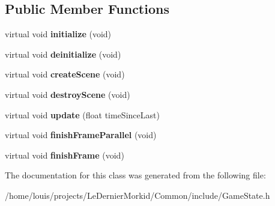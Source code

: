 \subsection*{Public Member Functions}
\begin{DoxyCompactItemize}
\item 
\mbox{\label{class_common_1_1_game_state_a4e7fa2fbc9080111213ce379eb33d082}} 
virtual void {\bfseries initialize} (void)
\item 
\mbox{\label{class_common_1_1_game_state_a7cda78fa6c4a405ead90c6e0bc895c85}} 
virtual void {\bfseries deinitialize} (void)
\item 
\mbox{\label{class_common_1_1_game_state_a30b77d03dd849ebb2d6698686e9e7619}} 
virtual void {\bfseries create\+Scene} (void)
\item 
\mbox{\label{class_common_1_1_game_state_a03176055b9cb064b2cea5b64cbf6647a}} 
virtual void {\bfseries destroy\+Scene} (void)
\item 
\mbox{\label{class_common_1_1_game_state_a38271924996d8c1bbdcbfee6ffe63f95}} 
virtual void {\bfseries update} (float time\+Since\+Last)
\item 
\mbox{\label{class_common_1_1_game_state_af9d8b5d245f12f68432653a50de46ca4}} 
virtual void {\bfseries finish\+Frame\+Parallel} (void)
\item 
\mbox{\label{class_common_1_1_game_state_ade96417c05bf3ad03e5bea4ee8578d89}} 
virtual void {\bfseries finish\+Frame} (void)
\end{DoxyCompactItemize}


The documentation for this class was generated from the following file\+:\begin{DoxyCompactItemize}
\item 
/home/louis/projects/\+Le\+Dernier\+Morkid/\+Common/include/Game\+State.\+h\end{DoxyCompactItemize}
